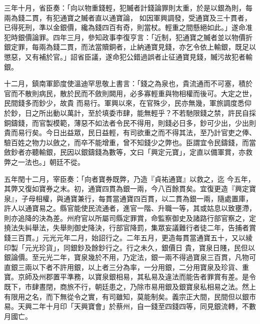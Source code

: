 \begin{pinyinscope}
 三年十月，省臣奏：「向以物重錢輕，犯贓者計錢論罪則太重，於是以銀為則，每兩為錢二貫，有犯通寶之贓者直以通寶論，
 如因軍興調發，受通寶及三十貫者，已得死刑，準以金銀價，纔為錢四百有奇，則當杖。輕重之間懸絕如此。」遂命准犯時銀價論罪。四年三月，參知政事李復亨言：「近制，犯通寶之贓者並以物價折銀定罪，每兩為錢二貫，而法當贖銅者，止納通寶見錢，亦乞令依上輸銀，既足以懲惡，又有補於官。」詔省臣議，遂命犯公錯過誤者止征通寶見錢，贓污故犯者輸銀。



 十二月，鎮南軍節度使溫迪罕思敬上書言：「錢之為泉也，貴流通而不可塞，積於官而不散則病民，散於民而不斂則闕用，必多寡輕重與物相權而後可。大定之世，民間錢多而鈔少，故貴
 而易行。軍興以來，在官殊少，民亦無幾，軍旅調度悉仰於鈔，日之所出動以萬計，至於填委市肆，能無輕乎？不若馳限錢之禁，許民自採銅鑄錢，而官製模範，薄惡不如法者令民不得用，則錢必日多，鈔可少出，少出則貴而易行矣。今日出益眾，民日益輕，有司欲重之而不得其法，至乃計官吏之俸、驗百姓之物力以斂之，而卒不能增重，曾不知錢少之弊也。臣謂宜令民鑄錢，而當斂鈔者亦聽輸銀，民因以銀鑄錢為數等，文曰「興定元寶」，定直以備軍賞，亦救弊之一法也。」朝廷不從。



 五年閏十二月，宰臣奏：「向者寶券既弊，乃造『貞祐通寶』以救之，迄
 今五年，其弊又復如寶券之末。初，通寶四貫為銀一兩，今八百餘貫矣。宜復更造『興定寶泉』，子母相權，與通寶兼行，每貫當通寶四百貫，以二貫為銀一兩，隨處置庫，許人以通寶易之。縣官能使民流通者，進官一階、升職一等，其或姑息以致壅滯，則亦追降的決為差。州府官以所屬司縣定罪賞，命監察御史及諸路行部官察之，定撓法失糾舉法，失舉則御史降決，行部官降罰，集眾妄議難行者徒二年，告捕者賞錢三百貫。」元光元年二月，始詔行之。二年五月，更造每貫當通寶五十，又以綾印製「元光珍貨」，同銀鈔及餘鈔行之。行之未久，銀價日
 貴，寶泉日賤，民但以銀論價。至元光二年，寶泉幾於不用，乃定法，銀一兩不得過寶泉三百貫，凡物可直銀三兩以下者不許用銀，以上者三分為率，一分用銀，二分用寶泉及珍貨、重寶。京師及州郡置平準務，以寶泉銀相易，其私易及違法而能告者罪賞有差。是令既下，市肆晝閉，商旅不行，朝廷患之，乃除市易用銀及銀寶泉私相易之法。然上有限用之名，而下無從令之實，有司雖知，莫能制矣。義宗正大間，民間但以銀市易。天興二年十月印「天興寶會」於蔡州，自一錢至四錢四等，同見銀流轉，不數月國亡。



\end{pinyinscope}
